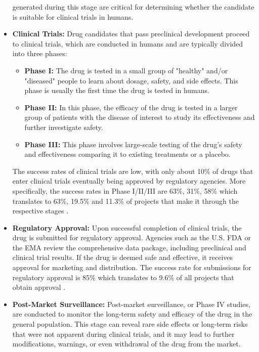 \begin{itemize}
          generated during this stage are critical for determining whether the candidate is
          suitable for clinical trials in humans.
    \item \textbf{Clinical Trials:} Drug candidates that pass preclinical development proceed to
          clinical trials, which are conducted in humans and are typically divided into three phases:
          \begin{itemize}
              \item \textbf{Phase I:} The drug is tested in a small group of "healthy" and/or "diseased" people to learn about
                    dosage, safety, and side effects. This phase is usually the first time the drug is tested in humans.
              \item \textbf{Phase II:} In this phase, the efficacy of the drug is tested in a larger
                    group of patients with the disease of interest to study its effectiveness and further investigate safety.
              \item \textbf{Phase III:} This phase involves large-scale testing of the drug's safety
                    and effectiveness comparing it to existing treatments or a placebo.
          \end{itemize}
          The success rates of clinical trials are low, with only about 10\% of drugs that enter clinical
          trials eventually being approved by regulatory agencies. More specifically, the success rates in
          Phase I/II/III are 63\%, 31\%, 58\% which translates to 63\%, 19.5\% and 11.3\% of projects that
          make it through the respective stages \citep{mullardParsingClinicalSuccess2016}.
    \item \textbf{Regulatory Approval:} Upon successful completion of clinical trials, the drug is
          submitted for regulatory approval. Agencies such as the U.S. \Ac{FDA} or the \Ac{EMA}
          review the comprehensive data package, including preclinical and clinical trial results.
          If the drug is deemed safe and effective, it receives approval for marketing and
          distribution. The success rate for submissions for regulatory approval is 85\% which
          translates to 9.6\% of all projects that obtain approval
          \citep{mullardParsingClinicalSuccess2016}.
    \item \textbf{Post-Market Surveillance:} Post-market surveillance, or Phase IV studies, are
          conducted to monitor the long-term safety and efficacy of the drug in the general population.
          This stage can reveal rare side effects or long-term risks that were not apparent during
          clinical trials, and it may lead to further modifications, warnings, or even withdrawal of the
          drug from the market.
\end{itemize}


